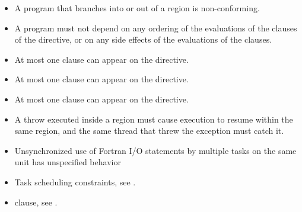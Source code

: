 \begin{itemize}
\item A program that branches into or out of a  region is non-conforming. 

\item A program must not depend on any ordering of the evaluations of the clauses of the 
 directive, or on any side effects of the evaluations of the clauses. 

\item At most one  clause can appear on the directive. 

\item At most one  clause can appear on the directive.

\item At most one  clause can appear on the directive.

\ccppspecificstart
\item A throw executed inside a  region must cause execution to resume within the 
same  region, and the same thread that threw the exception must catch it.
\ccppspecificend

\fortranspecificstart
\item Unsynchronized use of Fortran I/O statements by multiple tasks on the same unit has 
unspecified behavior
\fortranspecificend
\end{itemize}

\crossreferences
\begin{itemize}
\item Task scheduling constraints, see . 
\item {} clause, see .
\end{itemize}











